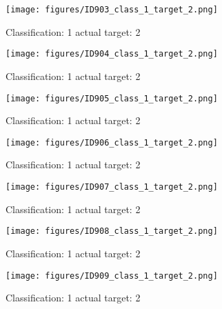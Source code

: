 \begin{figure}[h!]
\begin{center}
\texttt{[image: figures/ID903\_class\_1\_target\_2.png]}
\end{center}
\caption{ Classification: 1 actual target: 2}
\label{fig:ID903_class_1_target_2}
\end{figure}
\begin{figure}[h!]
\begin{center}
\texttt{[image: figures/ID904\_class\_1\_target\_2.png]}
\end{center}
\caption{ Classification: 1 actual target: 2}
\label{fig:ID904_class_1_target_2}
\end{figure}
\begin{figure}[h!]
\begin{center}
\texttt{[image: figures/ID905\_class\_1\_target\_2.png]}
\end{center}
\caption{ Classification: 1 actual target: 2}
\label{fig:ID905_class_1_target_2}
\end{figure}
\begin{figure}[h!]
\begin{center}
\texttt{[image: figures/ID906\_class\_1\_target\_2.png]}
\end{center}
\caption{ Classification: 1 actual target: 2}
\label{fig:ID906_class_1_target_2}
\end{figure}
\begin{figure}[h!]
\begin{center}
\texttt{[image: figures/ID907\_class\_1\_target\_2.png]}
\end{center}
\caption{ Classification: 1 actual target: 2}
\label{fig:ID907_class_1_target_2}
\end{figure}
\begin{figure}[h!]
\begin{center}
\texttt{[image: figures/ID908\_class\_1\_target\_2.png]}
\end{center}
\caption{ Classification: 1 actual target: 2}
\label{fig:ID908_class_1_target_2}
\end{figure}
\begin{figure}[h!]
\begin{center}
\texttt{[image: figures/ID909\_class\_1\_target\_2.png]}
\end{center}
\caption{ Classification: 1 actual target: 2}
\label{fig:ID909_class_1_target_2}
\end{figure}
